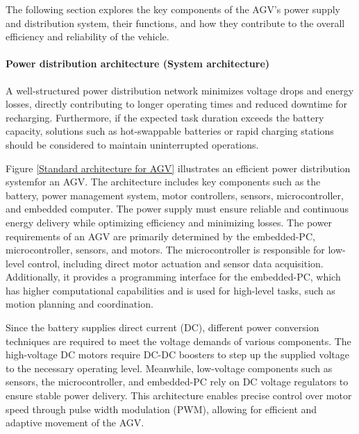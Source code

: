 \documentclass[../../main]{subfiles}
\begin{document}
The following section explores the key components of the AGV's 
power supply and distribution system, their functions, and how 
they contribute to the overall efficiency and reliability of the vehicle.

\paragraph{Power distribution architecture (System architecture)}

A well-structured power distribution network minimizes voltage drops and energy 
losses, directly contributing to longer operating times and reduced 
downtime for recharging. Furthermore, if the expected task duration 
exceeds the battery capacity, solutions such as hot-swappable 
batteries or rapid charging stations should be considered to maintain 
uninterrupted operations.

Figure \ref{Standard architecture for AGV} illustrates an efficient 
power distribution system\cite{system_architecture}for an AGV. The architecture 
includes key components such as the battery, 
power management system, motor controllers, sensors, 
microcontroller, and embedded computer. The power 
supply must ensure reliable and continuous energy 
delivery while optimizing efficiency and minimizing losses.
The power requirements of an AGV are primarily determined by 
the embedded-PC, microcontroller, sensors, and motors. 
The microcontroller is responsible for low-level control, 
including direct motor actuation and sensor data acquisition. 
Additionally, it provides a programming interface for the 
embedded-PC, which has higher computational capabilities 
and is used for high-level tasks, such as motion planning 
and coordination.

Since the battery supplies direct current (DC), different 
power conversion techniques are required to meet the voltage 
demands of various components. The high-voltage DC motors 
require DC-DC boosters to step up the supplied voltage to 
the necessary operating level. Meanwhile, low-voltage components 
such as sensors, the microcontroller, and embedded-PC rely on 
DC voltage regulators to ensure stable power delivery. 
This architecture enables precise control over motor speed 
through pulse width modulation (PWM), allowing for 
efficient and adaptive movement of the AGV.
\end{document}
